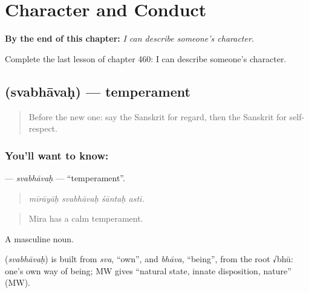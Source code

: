 
\chapter{Character and Conduct}
\label{ch:sa-character-and-conduct}

\begin{chapteropening}
\textbf{By the end of this chapter:} \emph{I can describe someone's character.}

Complete the last lesson of chapter 460: I can describe someone's character.
\end{chapteropening}

\section[\texorpdfstring{\sk{स्वभावः} (svabhāvaḥ)}{स्वभावः (svabhāvaḥ)}]{ (svabhāvaḥ) — temperament}

\label{lesson:SA-C460-svabhavah}



\begin{quote}
Before the new one: say the Sanskrit for regard, then the Sanskrit for self-respect.
\end{quote}

\subsection*{You'll want to know: }
\textbf{} — \emph{svabhāvaḥ} — \textquotedblleft{}temperament\textquotedblright{}.

\begin{quote}
   
\end{quote}

\begin{quote}
\emph{mīrāyāḥ svabhāvaḥ śāntaḥ asti.}
\end{quote}

\begin{quote}
Mira has a calm temperament.
\end{quote}

A masculine noun.

\begin{cousinweb}
\textbf{} (\emph{svabhāvaḥ}) is built from \emph{sva}, \textquotedblleft{}own\textquotedblright{}, and \emph{bhāva}, \textquotedblleft{}being\textquotedblright{}, from the root √bhū: one's own way of being; MW gives \textquotedblleft{}natural state, innate disposition, nature\textquotedblright{} (MW).
\end{cousinweb}

